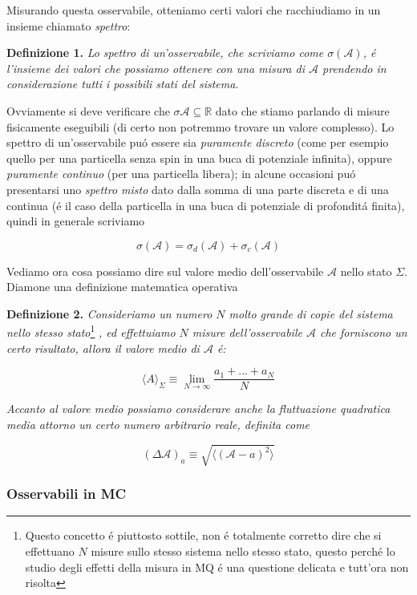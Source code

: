 Misurando questa osservabile, otteniamo certi valori che racchiudiamo in un insieme chiamato \textit{spettro}:

\textbf{Definizione 1.} \textit{Lo spettro di un'osservabile, che scriviamo come $\sigma(\mathcal{A})$, \'e l'insieme dei valori che possiamo ottenere con una misura di $\mathcal{A}$ prendendo in considerazione tutti i possibili stati del sistema}.

Ovviamente si deve verificare che $\sigma \mathcal{A} \subseteq \mathbb{R}$ dato che stiamo parlando di misure fisicamente eseguibili (di certo non potremmo trovare un valore complesso). Lo spettro di un'osservabile pu\'o essere sia \textit{puramente discreto} (come per esempio quello per una particella senza spin in una buca di potenziale infinita), oppure \textit{puramente continuo} (per una particella libera); in alcune occasioni pu\'o presentarsi uno \textit{spettro misto} dato dalla somma di una parte discreta e di una continua (\'e il caso della particella in una buca di potenziale di profondit\'a finita),
quindi in generale scriviamo 

$$\sigma(\mathcal{A}) = \sigma_d(\mathcal{A}) + \sigma_{c}(\mathcal{A})$$

Vediamo ora cosa possiamo dire sul valore medio dell'osservabile $\mathcal{A}$ nello stato $\Sigma$. Diamone una definizione matematica operativa 

\textbf{Definizione 2.} \textit{Consideriamo un numero $N$ molto grande di copie del sistema nello stesso stato}\footnote{Questo concetto \'e piuttosto sottile, non \'e totalmente corretto dire che si effettuano $N$ misure sullo stesso sistema nello stesso stato, questo perch\'e lo studio degli effetti della misura in MQ \'e una questione delicata e tutt'ora non risolta}
\textit{, ed effettuiamo $N$ misure dell'osservabile $\mathcal{A}$ che forniscono un certo risultato, allora il valore medio di $\mathcal{A}$ \'e:}

$$\langle A\rangle_{\Sigma}\equiv\operatorname*{lim}_{N\rightarrow\infty}{\frac{a_{1}+...+a_{N}}{N}}$$

\textit{Accanto al valore medio possiamo considerare anche la fluttuazione quadratica media attorno un certo numero arbitrario reale, definita come}

$$(\Delta\mathcal{A})_{a} \equiv \sqrt{\langle (\mathcal{A} - a)^2 \rangle}$$



\subsubsection{Osservabili in MC}

